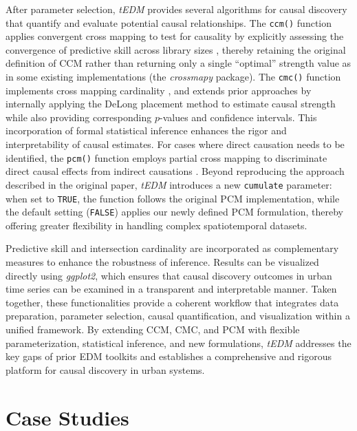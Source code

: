 \documentclass[authoryear,preprint,review,12pt]{elsarticle}
\begin{document}
After parameter selection, \textit{tEDM} provides several algorithms for causal discovery that quantify and evaluate potential causal relationships. The \texttt{ccm()} function applies convergent cross mapping to test for causality by explicitly assessing the convergence of predictive skill across library sizes \citep{sugihara2012ccm}, thereby retaining the original definition of CCM rather than returning only a single “optimal” strength value as in some existing implementations (the \textit{crossmapy} package). The \texttt{cmc()} function implements cross mapping cardinality \citep{tao2023cmc}, and extends prior approaches by internally applying the DeLong placement method to estimate causal strength while also providing corresponding $p$-values and confidence intervals. This incorporation of formal statistical inference enhances the rigor and interpretability of causal estimates. For cases where direct causation needs to be identified, the \texttt{pcm()} function employs partial cross mapping to discriminate direct causal effects from indirect causations \citep{leng2020pcm}. Beyond reproducing the approach described in the original paper, \textit{tEDM} introduces a new \texttt{cumulate} parameter: when set to \texttt{TRUE}, the function follows the original PCM implementation, while the default setting (\texttt{FALSE}) applies our newly defined PCM formulation, thereby offering greater flexibility in handling complex spatiotemporal datasets.  

Predictive skill and intersection cardinality are incorporated as complementary measures to enhance the robustness of inference. Results can be visualized directly using \textit{ggplot2}, which ensures that causal discovery outcomes in urban time series can be examined in a transparent and interpretable manner. Taken together, these functionalities provide a coherent workflow that integrates data preparation, parameter selection, causal quantification, and visualization within a unified framework. By extending CCM, CMC, and PCM with flexible parameterization, statistical inference, and new formulations, \textit{tEDM} addresses the key gaps of prior EDM toolkits and establishes a comprehensive and rigorous platform for causal discovery in urban systems.

\section{Case Studies}\label{sec_cases}
\end{document}

